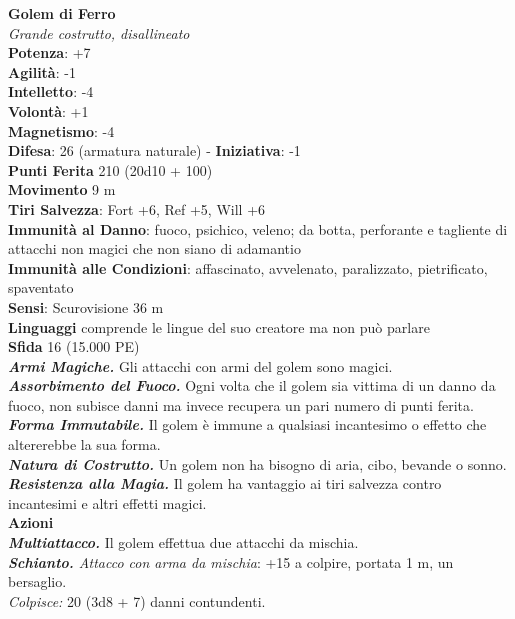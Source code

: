 \begin{multicols}{2}
\medskip\textbf{Golem di Ferro}\\
\emph{Grande costrutto, disallineato}\\
\textbf{Potenza}: +7\\
\textbf{Agilità}: -1\\
\textbf{Intelletto}: -4\\
\textbf{Volontà}: +1\\
\textbf{Magnetismo}: -4\\
\textbf{Difesa}: 26 (armatura naturale) - \textbf{Iniziativa}: -1\\
\textbf{Punti Ferita} 210 (20d10 + 100)\\
\textbf{Movimento} 9 m\\
\textbf{Tiri Salvezza}: Fort +6, Ref +5, Will +6\\
\textbf{Immunità al Danno}: fuoco, psichico, veleno; da botta, perforante e tagliente di attacchi non magici che non siano di adamantio\\
\textbf{Immunità alle Condizioni}: affascinato, avvelenato, paralizzato, pietrificato, spaventato\\
\textbf{Sensi}: Scurovisione 36 m\\
\textbf{Linguaggi} comprende le lingue del suo creatore ma non può parlare\\
\textbf{Sfida} 16 (15.000 PE)\smallskip\\
\emph{\textbf{Armi Magiche.}} Gli attacchi con armi del golem sono magici.\\
\emph{\textbf{Assorbimento del Fuoco.}} Ogni volta che il golem sia vittima di un danno da fuoco, non subisce danni ma invece recupera un pari numero di punti ferita.\\
\emph{\textbf{Forma Immutabile.}} Il golem è immune a qualsiasi incantesimo o effetto che altererebbe la sua forma.\\
\emph{\textbf{Natura di Costrutto.}} Un golem non ha bisogno di aria, cibo, bevande o sonno.\\
\emph{\textbf{Resistenza alla Magia.}} Il golem ha vantaggio ai tiri salvezza contro incantesimi e altri effetti magici.\\
\smallskip\textbf{Azioni}\\
\emph{\textbf{Multiattacco.}} Il golem effettua due attacchi da mischia. \\
\emph{\textbf{Schianto.} Attacco con arma da mischia}: +15 a colpire, portata 1 m, un bersaglio.\\
\emph{Colpisce:} 20 (3d8 + 7) danni contundenti.\\

\end{multicols}
